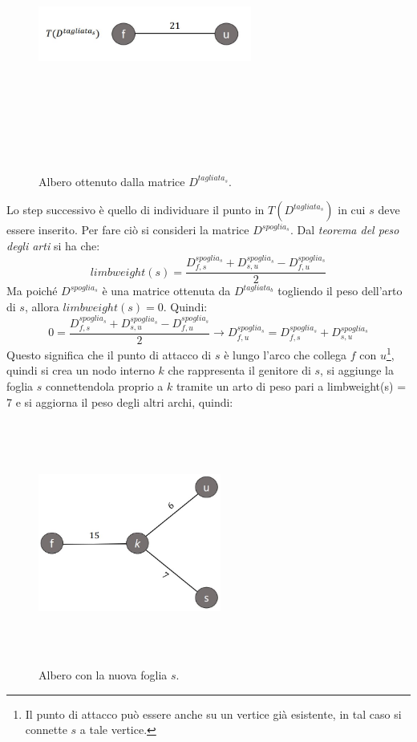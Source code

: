 \begin{figure}[h!]
\centering
	\includegraphics[height=9cm, width=7cm, keepaspectratio]{additive_tree_2.jpg}
 	\caption{Albero ottenuto dalla matrice $D^{tagliata_{s}}$.}
  	\label{fig:additivePhylogeny_2}
\end{figure}
\newline
Lo step successivo è quello di individuare il punto in $T(D^{tagliata_{s}})$ in cui $s$ deve essere inserito. Per fare ciò si consideri la matrice $D^{spoglia_{s}}$. Dal \textit{teorema del peso degli arti} si ha che:
\[limbweight(s)=\frac{D^{spoglia_{s}}_{f,s}+D^{spoglia_{s}}_{s,u}-D^{spoglia_{s}}_{f,u}}{2}\]
Ma poiché $D^{spoglia_{s}}$ è una matrice ottenuta da $D^{tagliata_{b}}$ togliendo il peso dell'arto di $s$, allora $limbweight(s)=0$. Quindi:
\[
0=\frac{D^{spoglia_{s}}_{f,s}+D^{spoglia_{s}}_{s,u}-D^{spoglia_{s}}_{f,u}}{2} \rightarrow D^{spoglia_{s}}_{f,u}=D^{spoglia_{s}}_{f,s}+D^{spoglia_{s}}_{s,u}
\]
Questo significa che il punto di attacco di $s$  è lungo l'arco che collega $f$ con $u$\footnote{Il punto di attacco può essere anche su un vertice già esistente, in tal caso si connette $s$ a tale vertice.}, quindi si crea un nodo interno $k$ che rappresenta il genitore di $s$, si aggiunge la foglia $s$ connettendola proprio a $k$ tramite un arto di peso pari a limbweight(s) = 7 e si aggiorna il peso degli altri archi, quindi:
\newpage
\begin{figure}[h!]
\centering
	\includegraphics[height=8cm, width=6cm, keepaspectratio]{additive_tree_3.jpg}
 	\caption{Albero con la nuova foglia $s$.}
  	\label{fig:additivePhylogeny_3}
\end{figure}
